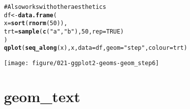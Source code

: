 \documentclass[a4paper,titlepage]{tufte-handout}\usepackage{graphicx, color}
\makeatletter
\def\maxwidth{ %
  \ifdim\Gin@nat@width>\linewidth
    \linewidth
  \else
    \Gin@nat@width
  \fi
}
\newcommand{\hlfunctioncall}[1]{\textcolor[rgb]{0.501960784313725,0,0.329411764705882}{\textbf{#1}}}%
\newcommand{\hlstring}[1]{\textcolor[rgb]{0.6,0.6,1}{#1}}%
\newcommand{\hlcomment}[1]{\textcolor[rgb]{0.180392156862745,0.6,0.341176470588235}{#1}}%
\newenvironment{kframe}{%
 \def\at@end@of@kframe{}%
 \ifinner\ifhmode%
  \def\at@end@of@kframe{\end{minipage}}%
  \begin{minipage}{\columnwidth}%
 \fi\fi%
 \def\FrameCommand##1{\hskip\@totalleftmargin \hskip-\fboxsep
 \colorbox{shadecolor}{##1}\hskip-\fboxsep
     \hskip-\linewidth \hskip-\@totalleftmargin \hskip\columnwidth}%
 \MakeFramed {\advance\hsize-\width
   \@totalleftmargin\z@ \linewidth\hsize
   \@setminipage}}%
 {\par\unskip\endMakeFramed%
 \at@end@of@kframe}
\newenvironment{knitrout}{}{} %
\makeatother
\begin{document}
\begin{knitrout}
\begin{kframe}
\begin{alltt}
\hlcomment{# Also works with other aesthetics}
df <- \hlfunctioncall{data.frame}(
  x = \hlfunctioncall{sort}(\hlfunctioncall{rnorm}(50)),
  trt = \hlfunctioncall{sample}(\hlfunctioncall{c}(\hlstring{"a"}, \hlstring{"b"}), 50, rep = TRUE)
)
\hlfunctioncall{qplot}(\hlfunctioncall{seq_along}(x), x, data = df, geom=\hlstring{"step"}, colour = trt)
\end{alltt}
\end{kframe}
\texttt{[image: figure/021-ggplot2-geoms-geom\_step6]} 
\begin{kframe}\begin{alltt}


\end{alltt}
\end{kframe}
\end{knitrout}



\section{geom\_text}
\end{document}
